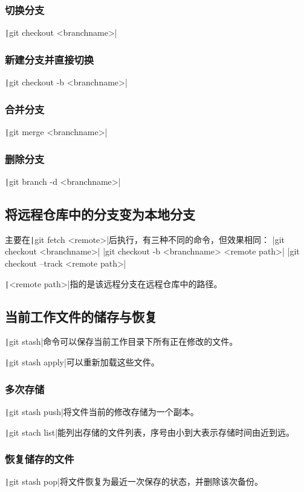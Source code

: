\documentclass[fontset=ubuntu]{ctexart}
\begin{document}
\subsubsection{切换分支}
\texttt|git checkout <branchname>|

\subsubsection{新建分支并直接切换}
\texttt|git checkout -b <branchname>|

\subsubsection{合并分支}
\texttt|git merge <branchname>|

\subsubsection{删除分支}
\texttt|git branch -d <branchname>|

\subsection{将远程仓库中的分支变为本地分支}
主要在\texttt|git fetch <remote>|后执行，有三种不同的命令，但效果相同：
|git checkout  <branchname>|
|git checkout -b <branchname> <remote path>|
|git checkout  --track <remote path>|

\texttt|<remote path>|指的是该远程分支在远程仓库中的路径。

\subsection{当前工作文件的储存与恢复}
\texttt|git stash|命令可以保存当前工作目录下所有正在修改的文件。

\texttt|git stash apply|可以重新加载这些文件。

\subsubsection{多次存储}
\texttt|git stash push|将文件当前的修改存储为一个副本。

\texttt|git stach list|能列出存储的文件列表，序号由小到大表示存储时间由近到远。

\subsubsection{恢复储存的文件}
\texttt|git stash pop|将文件恢复为最近一次保存的状态，并删除该次备份。
\end{document}
